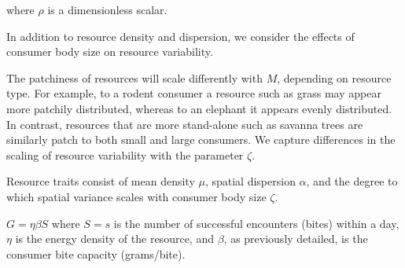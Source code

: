 \documentclass[onecolumn,preprintnumbers,amsmath,amssymb,superscriptaddress]{revtex4}
\begin{document}
where $\rho$ is a dimensionless scalar.


In addition to resource density and dispersion, we consider the effects of consumer body size on resource variability.




The patchiness of resources will scale differently with $M$, depending on resource type.
For example, to a rodent consumer a resource such as grass may appear more patchily distributed, whereas to an elephant it appears evenly distributed.
In contrast, resources that are more stand-alone such as savanna trees are similarly patch to both small and large consumers.
We capture differences in the scaling of resource variability with the parameter $\zeta$.



Resource traits consist of mean density $\mu$, spatial dispersion $\alpha$, and the degree to which spatial variance scales with consumer body size $\zeta$.

$G = \eta \beta S$ where $S=s$ is the number of successful encounters (bites) within a day, $\eta$ is the energy density of the resource, and $\beta$, as previously detailed, is the consumer bite capacity (grams/bite).
\end{document}
